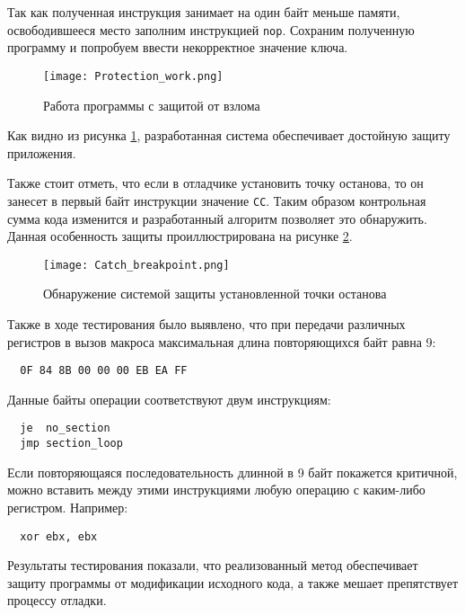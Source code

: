 Так как полученная инструкция занимает на один байт меньше памяти,
освободившееся место заполним инструкцией \verb!nop!. Сохраним полученную
программу и попробуем ввести некорректное значение ключа.

\begin{figure}[htpb]
  \centering
  \texttt{[image: Protection\_work.png]}
  \caption{Работа программы с защитой от взлома}
  \label{fig:protection_work}
\end{figure}

Как видно из рисунка \ref{fig:protection_work}, разработанная система
обеспечивает достойную защиту приложения.

Также стоит отметь, что если в отладчике установить точку останова, то он
занесет в первый байт инструкции значение \verb!CC!. Таким образом контрольная
сумма кода изменится и разработанный алгоритм позволяет это обнаружить. Данная
особенность защиты проиллюстрирована на рисунке \ref{fig:break_poin_catch}.

\begin{figure}[htpb]
  \centering
  \texttt{[image: Catch\_breakpoint.png]}
  \caption{Обнаружение системой защиты установленной точки останова}
  \label{fig:break_poin_catch}
\end{figure}

Также в ходе тестирования было выявлено, что при передачи различных регистров в
вызов макроса максимальная длина повторяющихся байт равна 9:
\begin{verbatim}
  0F 84 8B 00 00 00 EB EA FF
\end{verbatim}

Данные байты операции соответствуют двум инструкциям:
\begin{verbatim}
  je  no_section
  jmp section_loop
\end{verbatim}

Если повторяющаяся последовательность длинной в 9 байт покажется критичной,
можно вставить между этими инструкциями любую операцию с каким-либо регистром.
Например:
\begin{verbatim}
  xor ebx, ebx
\end{verbatim}

Результаты тестирования показали, что реализованный метод обеспечивает защиту
программы от модификации исходного кода, а также мешает препятствует процессу
отладки. 
